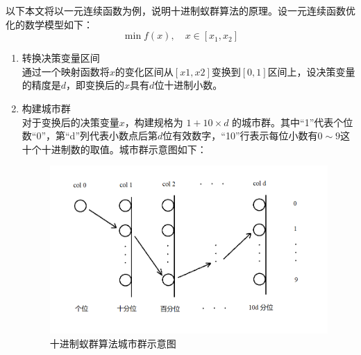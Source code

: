 \documentclass[../main.tex]{subfiles}
\begin{document}
以下本文将以一元连续函数为例，说明十进制蚁群算法的原理。设一元连续函数优化的数学模型如下：
\begin{equation}
\min f(x), \quad x \in [x_1 , x_2]
\end{equation}
\begin{enumerate}
\item 转换决策变量区间\\
通过一个映射函数将\(x\)的变化区间从\([x1,x2]\)变换到\([0,1]\)区间上，设决策变量的精度是\(d\)，即变换后的\(x\)具有\(d\)位十进制小数。
\item 构建城市群\\
对于变换后的决策变量\(x\)，构建规格为 \(1+10\times d\) 的城市群。其中``1''代表个位数``0''，第``d''列代表小数点后第\(d\)位有效数字，``10''行表示每位小数有\(0 {\sim} 9\)这十个十进制数的取值。城市群示意图如下：

\begin{figure}[H]
\centering
\includegraphics[scale = 0.5]{cities.png}
\caption{十进制蚁群算法城市群示意图}\label{fig:cities}
\end{figure}


\end{enumerate}
\end{document}
